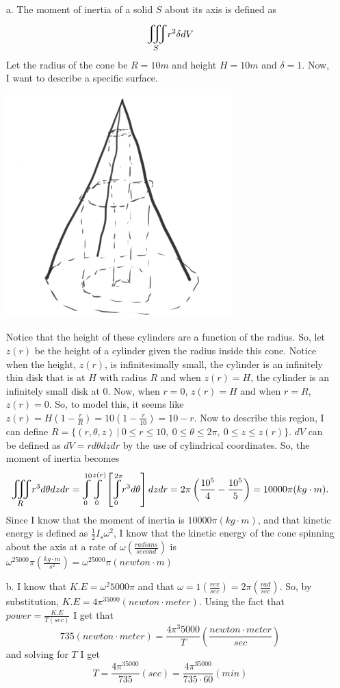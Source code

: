 \documentclass[titlepage]{article}
\begin{document}
\begin{solution}
\begin{itemize}
\item[a.]The moment of inertia of a solid $S$ about its axis is defined as
$$\bigiiint{S}{} r^2\delta dV $$
Let the radius of the cone be $R = 10m$ and height $H = 10m$ and $\delta = 1$. Now, I want to describe a specific surface.
\begin{center} \includegraphics[scale=.5]{cone}\end{center}
Notice that the height of these cylinders are a function of the radius. So, let $z(r)$ be the height of a cylinder given the radius inside this cone. Notice when the height, $z(r)$, is infinitesimally small, the cylinder is an infinitely thin disk that is at $H$ with radius $R$ and when $z(r)= H$, the cylinder is an infinitely small disk at 0. Now, when $r = 0$, $z(r) = H$ and when $r = R$, $z(r) = 0$. So, to model this, it seems like $z(r) = H(1-\frac{r}{R}) = 10(1-\frac{r}{10}) = 10-r$. Now to describe this region, I can define $R = \{(r,\theta,z) \ | \ 0 \leq r \leq 10, \ 0\leq \theta\leq 2\pi, \ 0\leq z\leq z(r)\}$. $dV$ can be defined as $dV = rd\theta dzdr$ by the use of cylindrical coordinates. So, the moment of inertia becomes
$$\bigiiint{R}{}r^3d\theta dzdr = \mlvarint\limits_{0}^{10}\mlvarint\limits_{0}^{z(r)}\left[\mlvarint\limits_{0}^{2\pi}r^3 d\theta\right]dzdr = 2\pi\left(\frac{10^5}{4}-\frac{10^5}{5}\right) = 10000\pi(kg\cdot m).$$
Since I know that the moment of inertia is $10000\pi(kg\cdot m)$, and that kinetic energy is defined as $\frac{1}{2}I_s\omega^2$, I know that the kinetic energy of the cone spinning about the axis at a rate of $\omega\left(\frac{radians}{second}\right)$ is $\omega^25000\pi\left(\frac{kg\cdot m}{s^2}\right) = \omega^25000\pi (newton\cdot m)$
\item[b.] I know that $K.E = \omega^2 5000\pi$ and that $\omega = 1\left(\frac{rev}{sec}\right) = 2\pi \left(\frac{rad}{sec}\right)$. So, by substitution, 
$K.E = 4\pi^35000 (newton\cdot meter)$. Using the fact that $power = \frac{K.E}{T(sec)}$ I get that 
$$735\left(newton\cdot meter\right) = \frac{4\pi^3 5000}{T}\left(\frac{newton\cdot meter}{sec}\right)$$   
and solving for $T$ I get
$$T =  \frac{4\pi^35000}{735} (sec) = \frac{4\pi^35000}{735\cdot60}(min)$$
\end{itemize}
\end{solution}
\end{document}
